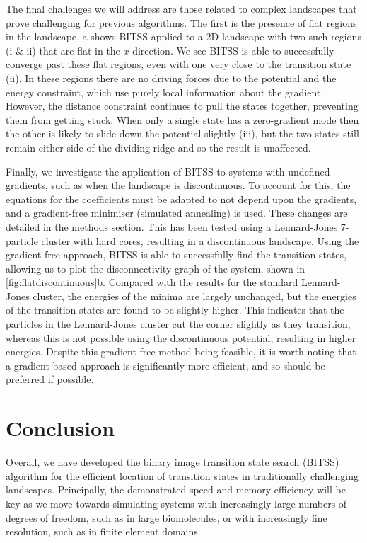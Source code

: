 \documentclass[twocolumn,10pt]{revtex4-2}
\begin{document}
The final challenges we will address are those related to complex landscapes that prove challenging for previous algorithms.
The first is the presence of flat regions in the landscape.
a shows BITSS applied to a 2D landscape with two such regions (i \& ii) that are flat in the $x$-direction.
We see BITSS is able to successfully converge past these flat regions, even with one very close to the transition state (ii).
In these regions there are no driving forces due to the potential and the energy constraint, which use purely local information about the gradient.
However, the distance constraint continues to pull the states together, preventing them from getting stuck.
When only a single state has a zero-gradient mode then the other is likely to slide down the potential slightly (iii), but the two states still remain either side of the dividing ridge and so the result is unaffected.


Finally, we investigate the application of BITSS to systems with undefined gradients, such as when the landscape is discontinuous.
To account for this, the equations for the coefficients must be adapted to not depend upon the gradients, and a gradient-free minimiser (simulated annealing) is used.
These changes are detailed in the methods section.
This has been tested using a Lennard-Jones 7-particle cluster with hard cores, resulting in a discontinuous landscape.
Using the gradient-free approach, BITSS is able to successfully find the transition states, allowing us to plot the disconnectivity graph of the system, shown in \cref{fig:flatdiscontinuous}b.
Compared with the results for the standard Lennard-Jones cluster, the energies of the minima are largely unchanged, but the energies of the transition states are found to be slightly higher.
This indicates that the particles in the Lennard-Jones cluster cut the corner slightly as they transition, whereas this is not possible using the discontinuous potential, resulting in higher energies.
Despite this gradient-free method being feasible, it is worth noting that a gradient-based approach is significantly more efficient, and so should be preferred if possible.


\section{Conclusion}
Overall, we have developed the binary image transition state search (BITSS) algorithm for the efficient location of transition states in traditionally challenging landscapes.
Principally, the demonstrated speed and memory-efficiency will be key as we move towards simulating systems with increasingly large numbers of degrees of freedom, such as in large biomolecules, or with increasingly fine resolution, such as in finite element domains.
\end{document}
